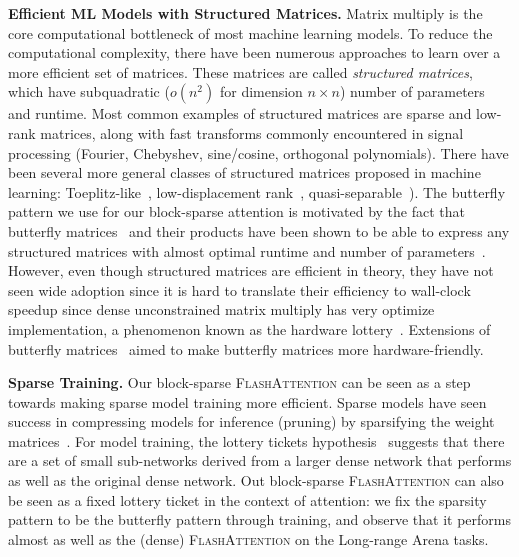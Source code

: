 \documentclass{article}
\newcommand{\sysname}{\textsc{FlashAttention}\xspace}
\begin{document}
\textbf{Efficient ML Models with Structured Matrices.}
Matrix multiply is the core computational bottleneck of most machine learning
models.
To reduce the computational complexity, there have been numerous approaches to
learn over a more efficient set of matrices.
These matrices are called \emph{structured matrices}, which have subquadratic
($o(n^2)$ for dimension $n \times n$) number of parameters and runtime.
Most common examples of structured matrices are sparse and low-rank matrices,
along with fast transforms commonly encountered in signal processing (Fourier,
Chebyshev, sine/cosine, orthogonal polynomials).
There have been several more general classes of structured matrices proposed in
machine learning: Toeplitz-like~\citep{sindhwani2015structured},
low-displacement rank~\citep{kailath1979displacement},
quasi-separable~\citep{eidelman1999new}).
The butterfly pattern we use for our block-sparse attention is motivated by the
fact that butterfly matrices~\citep{parker1995random, dao2019learning} and their
products have been shown to be able to express any structured matrices with
almost optimal runtime and number of
parameters~\citep{desa2018two,dao2020kaleidoscope}.
However, even though structured matrices are efficient in theory, they have not
seen wide adoption since it is hard to translate their efficiency to wall-clock
speedup since dense unconstrained matrix multiply has very optimize
implementation, a phenomenon known as the hardware
lottery~\citep{hooker2020hardware}.
Extensions of butterfly matrices~\citep{dao2021pixelated,dao2022monarch} aimed
to make butterfly matrices more hardware-friendly.

\textbf{Sparse Training.}
Our block-sparse \sysname can be seen as a step towards making sparse model
training more efficient.
Sparse models have seen success in compressing models for inference (pruning) by
sparsifying the weight
matrices~\citep{han2015deep,han2015learning,sanh2020movement,
  NIPS2017_a51fb975,dong2017learning}.
For model training, the lottery
tickets hypothesis~\citep{frankle2018lottery,frankle2019stabilizing,frankle2020linear}
suggests that there are a set of small sub-networks derived from a larger dense
network that performs as well as the original dense network.
Out block-sparse \sysname can also be seen as a fixed lottery ticket in the
context of attention: we fix the sparsity pattern to be the butterfly pattern
through training, and observe that it performs almost as well as the (dense)
\sysname on the Long-range Arena tasks.
\end{document}
